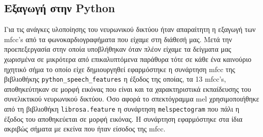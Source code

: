 \documentclass[../main.tex]{subfiles}
\begin{document}
\subsection{Eξαγωγή στην Python}

Για τις ανάγκες υλοποίησης του νευρωνικού δικτύου ήταν απαραίτητη η εξαγωγή των
mfcc's από τα φωνοκαρδιογραφήματα  που είχαμε στη διάθεσή μας. Μετά την
προεπεξεργασία στην οποία υποβλήθηκαν όταν πλέον είχαμε τα δείγματα μας
χωρισμένα σε μικρότερα από επικαλυπτόμενα παράθυρα τότε σε κάθε ένα καινούριο
ηχητικό σήμα το οποίο είχε δημιουργηθεί εφαρμόστηκε η συνάρτηση mfcc της
βιβλιοθήκης \verb|python_speech_features| η έξοδος της οποίας, τα 13 mfcc's,
αποθηκεύτηκαν σε μορφή εικόνας που είναι και τα χαρακτηριστικά εκπαίδευσης  του
συνελικτικού νευρωνικού δικτύου. Όσο αφορά το σπεκτόγραμμα mel χρησιμοποιήθηκε
από τη βιβλιοθήκη \verb|librosa.feature| η συνάρτηση \verb|melspectogram| που
πάλι η έξοδος του αποθηκεύεται σε μορφή εικόνας. Η συνάρτηση εφαρμόστηκε στα
ίδια ακριβώς σήματα με εκείνα που ήταν είσοδος της mfcc.
\end{document}

